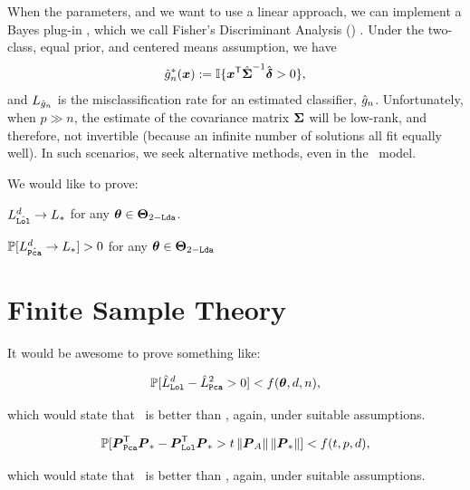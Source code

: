 \documentclass[10pt]{article}
\begin{document}
When the parameters, and we want to use a linear approach, we can implement a Bayes plug-in \Lda, which we call Fisher's Discriminant Analysis (\Fld) \cite{Fisher1925a}.  Under the two-class, equal prior, and centered means assumption, we have 
\begin{align}
\hat{g}^*_n(\boldsymbol{x}) := \mathbb{I}\{ \boldsymbol{x}^{\mathsf{T}} \hat{\boldsymbol{\Sigma}}^{-1} \hat{\boldsymbol{\delta}} > 0 \},
\end{align}
and $L_{\hat{g}_n}$ is the misclassification rate for an estimated classifier, $\hat{g}_n$.
Unfortunately, when $p \gg n$, the estimate of the covariance matrix $\boldsymbol{\Sigma}$ will be low-rank, and therefore, not invertible (because an infinite number of solutions all fit equally well).  In such scenarios, we seek alternative methods, even in the \Lda~model.

We would like to prove:
\begin{lem}
$L_{\hat{{\sc \texttt{Lol}}}}^d \rightarrow L_*$ for any $\boldsymbol{\theta} \in \boldsymbol{\Theta}_{2-{\sc \texttt{Lda}}}$.
\end{lem}


\begin{lem}
$\mathbb{P}[L_{\hat{{\sc \texttt{Pca}}}}^d \rightarrow L_*]>0$ for any $\boldsymbol{\theta} \in \boldsymbol{\Theta}_{2-{\sc \texttt{Lda}}}$
\end{lem}

\newpage
\section{Finite Sample Theory}

It would be awesome to prove something like:
\begin{thm}
\begin{align*}
\mathbb{P}[ \hat{L}_{{\sc \texttt{Lol}}}^d - \hat{L}_{{\sc \texttt{Pca}}}^2  > 0  ] < f(\boldsymbol{\theta},d,n),
\end{align*}
\end{thm}
which would state that \Lol~is better than \Pca, again, under suitable assumptions.


\begin{thm}
\begin{align*}
\mathbb{P}[ \boldsymbol{P}_{{\sc \texttt{Pca}}} ^{\mathsf{T}} \boldsymbol{P}_*  - \boldsymbol{P}_{{\sc \texttt{Lol}}} ^{\mathsf{T}} \boldsymbol{P}_*  > t \left \lVert\boldsymbol{P}_A \right \rVert \left \lVert\boldsymbol{P}_* \right \rVert ] < f(t,p,d),
\end{align*}
\end{thm}
which would state that \Lol~is better than \Pca, again, under suitable assumptions.
\end{document}

